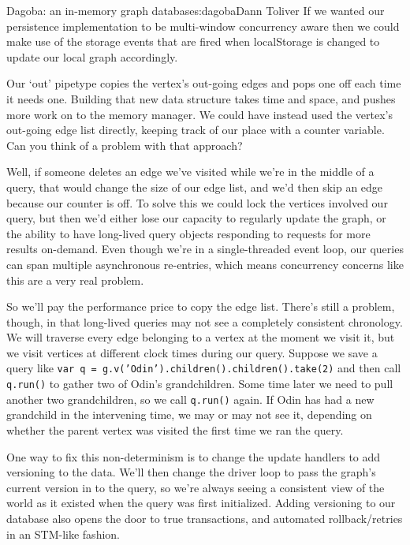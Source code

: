 \begin{aosachapter}{Dagoba: an in-memory graph database}{s:dagoba}{Dann Toliver}
If we wanted our persistence implementation to be multi-window
concurrency aware then we could make use of the storage events that are
fired when localStorage is changed to update our local graph
accordingly.

\label{updates}

Our `out' pipetype copies the vertex's out-going edges and pops one off
each time it needs one. Building that new data structure takes time and
space, and pushes more work on to the memory manager. We could have
instead used the vertex's out-going edge list directly, keeping track of
our place with a counter variable. Can you think of a problem with that
approach?

Well, if someone deletes an edge we've visited while we're in the middle
of a query, that would change the size of our edge list, and we'd then
skip an edge because our counter is off. To solve this we could lock the
vertices involved our query, but then we'd either lose our capacity to
regularly update the graph, or the ability to have long-lived query
objects responding to requests for more results on-demand. Even though
we're in a single-threaded event loop, our queries can span multiple
asynchronous re-entries, which means concurrency concerns like this are
a very real problem.

So we'll pay the performance price to copy the edge list. There's still
a problem, though, in that long-lived queries may not see a completely
consistent chronology. We will traverse every edge belonging to a vertex
at the moment we visit it, but we visit vertices at different clock
times during our query. Suppose we save a query like
\texttt{var q = g.v('Odin').children().children().take(2)} and then call
\texttt{q.run()} to gather two of Odin's grandchildren. Some time later
we need to pull another two grandchildren, so we call \texttt{q.run()}
again. If Odin has had a new grandchild in the intervening time, we may
or may not see it, depending on whether the parent vertex was visited
the first time we ran the query.

One way to fix this non-determinism is to change the update handlers to
add versioning to the data. We'll then change the driver loop to pass
the graph's current version in to the query, so we're always seeing a
consistent view of the world as it existed when the query was first
initialized. Adding versioning to our database also opens the door to
true transactions, and automated rollback/retries in an STM-like
fashion.

\label{future-directions}


\end{aosachapter}
